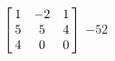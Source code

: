 {$\left[\hskip -3pt \begin{array}{ccc} 1&-2&1\\  5&5&4
\\  4&0&0\end{array}\hskip -3pt \right]$} 
{$-52$}

  

 

